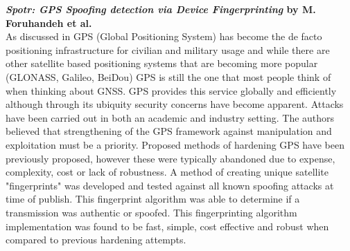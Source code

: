 \medskip

\textbf{\emph{Spotr: GPS Spoofing detection via Device Fingerprinting} by M. Foruhandeh et al.}\\
As discussed in \cite{RN7} GPS (Global Positioning System) has become the de facto positioning infrastructure for civilian and military usage and while there are other
satellite based positioning systems that are becoming more popular (GLONASS, Galileo, BeiDou) GPS is still the one that most people think of when thinking about GNSS. GPS
provides this service globally and efficiently although through its ubiquity security concerns have become apparent. Attacks have been carried out in both an academic and
industry setting. The authors believed that strengthening of the GPS framework against manipulation and exploitation must be a priority. Proposed methods of hardening GPS
have been previously proposed, however these were typically abandoned due to expense, complexity, cost or lack of robustness. A method of creating unique satellite
"fingerprints" was developed and tested against all known spoofing attacks at time of publish. This fingerprint algorithm was able to determine if a transmission was
authentic or spoofed. This fingerprinting algorithm implementation was found to be fast, simple, cost effective and robust when compared to previous hardening attempts.

\medskip

